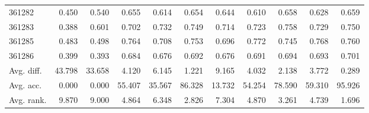 \begin{tabular}{lrrrrrrrrrr}
361282 & 0.450 & 0.540 & 0.655 & 0.614 & 0.654 & 0.644 & 0.610 & 0.658 & 0.628 & 0.659 \\
361283 & 0.388 & 0.601 & 0.702 & 0.732 & 0.749 & 0.714 & 0.723 & 0.758 & 0.729 & 0.750 \\
361285 & 0.483 & 0.498 & 0.764 & 0.708 & 0.753 & 0.696 & 0.772 & 0.745 & 0.768 & 0.760 \\
361286 & 0.399 & 0.393 & 0.684 & 0.676 & 0.692 & 0.676 & 0.691 & 0.694 & 0.693 & 0.701 \\
Avg. diff. & 43.798 & 33.658 & 4.120 & 6.145 & 1.221 & 9.165 & 4.032 & 2.138 & 3.772 & 0.289 \\
Avg. acc. & 0.000 & 0.000 & 55.407 & 35.567 & 86.328 & 13.732 & 54.254 & 78.590 & 59.310 & 95.926 \\
Avg. rank. & 9.870 & 9.000 & 4.864 & 6.348 & 2.826 & 7.304 & 4.870 & 3.261 & 4.739 & 1.696 \\
\bottomrule
\end{tabular}

